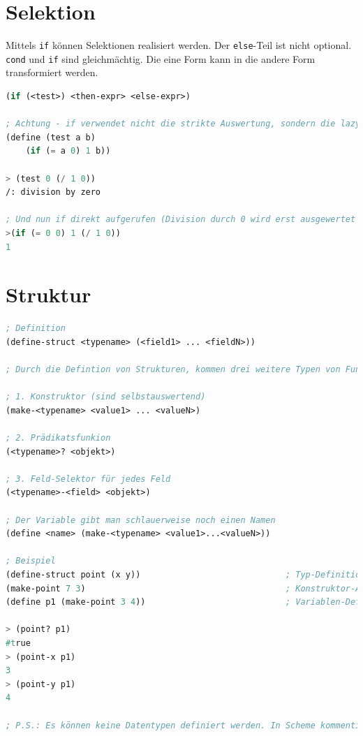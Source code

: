 \section{Selektion}
Mittels \verb|if| können Selektionen realisiert werden. Der \verb|else|-Teil ist nicht optional. \verb|cond| und \verb|if| sind gleichmächtig. Die eine Form kann in die andere Form transformiert werden.

\begin{lstlisting}[language=Lisp, caption=Selektion]
(if (<test>) <then-expr> <else-expr>)

; Achtung - if verwendet nicht die strikte Auswertung, sondern die lazy evaluation.
(define (test a b)
	(if (= a 0) 1 b))
	
> (test 0 (/ 1 0))
/: division by zero	

; Und nun if direkt aufgerufen (Division durch 0 wird erst ausgewertet wenn false)
>(if (= 0 0) 1 (/ 1 0))
1
\end{lstlisting}

\section{Struktur}

\begin{lstlisting}[language=Lisp, caption=Strukturen]
; Definition
(define-struct <typename> (<field1> ... <fieldN>))

; Durch die Defintion von Strukturen, kommen drei weitere Typen von Funktionen mit:

; 1. Konstruktor (sind selbstauswertend)
(make-<typename> <value1> ... <valueN>)

; 2. Prädikatsfunkion
(<typename>? <objekt>)

; 3. Feld-Selektor für jedes Feld
(<typename>-<field> <objekt>)

; Der Variable gibt man schlauerweise noch einen Namen
(define <name> (make-<typename> <value1>...<valueN>))

; Beispiel
(define-struct point (x y)) 							; Typ-Definition
(make-point 7 3) 										; Konstruktor-Aufruf
(define p1 (make-point 3 4)) 							; Variablen-Definition

> (point? p1)
#true
> (point-x p1)
3
> (point-y p1)
4

; P.S.: Es können keine Datentypen definiert werden. In Scheme kommentiert man die Datentypen in den Strukturen. Scheme hat einen vordefinierte Struktur für den Punkt: posn (x y).
\end{lstlisting}

